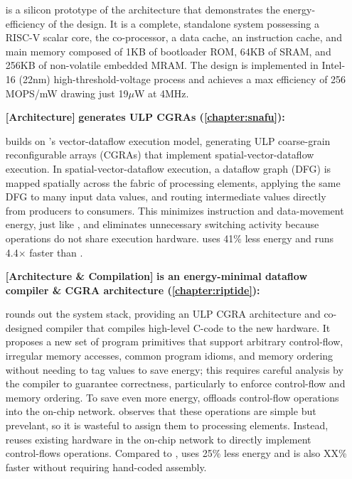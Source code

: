 \begin{itemize}
\manicsilicon is a silicon prototype of the \manic architecture that demonstrates the energy-efficiency of the design.
% 
It is a complete, standalone system possessing a RISC-V scalar core, the \manic co-processor, a data cache, an instruction cache, and main memory composed of 1KB of bootloader ROM, 64KB of SRAM, and 256KB of non-volatile embedded MRAM.
% 
The design is implemented in Intel-16 (22nm) high-threshold-voltage process and achieves a max efficiency of 256 MOPS/mW drawing just 19$\mu$W at 4MHz.
% 

\item[\textbf{[Architecture]}]
\textbf{\snafu generates ULP CGRAs (\autoref{chapter:snafu}): }

\snafu builds on \manic's vector-dataflow execution model, generating ULP coarse-grain reconfigurable arrays (CGRAs) that implement spatial-vector-dataflow execution.
% 
In spatial-vector-dataflow execution, a dataflow graph (DFG) is mapped spatially across the fabric of processing elements, applying the same DFG to many input data values, and routing intermediate values directly from producers to consumers.
% 
This minimizes instruction and data-movement energy, just like \manic, and eliminates unnecessary switching activity because operations do not share execution hardware.
% 
\snafu uses 41$\%$ less energy and runs 4.4$\times$ faster than \manic.
% 

\item[\textbf{[Architecture \& Compilation]}]
\textbf{\riptide is an energy-minimal dataflow compiler \& CGRA architecture (\autoref{chapter:riptide}): }

\riptide rounds out the system stack, providing an ULP CGRA architecture and co-designed compiler that compiles high-level C-code to the new hardware.
% 
It proposes a new set of program primitives that support arbitrary control-flow, irregular memory accesses, common program idioms, and memory ordering without needing to tag values to save energy; this requires careful analysis by the compiler to guarantee correctness, particularly to enforce control-flow and memory ordering.
% 
To save even more energy, \riptide offloads control-flow operations into the on-chip network.
% 
\riptide observes that these operations are simple but prevelant, so it is wasteful to assign them to processing elements.
% 
Instead, \riptide reuses existing hardware in the on-chip network to directly implement control-flows operations.
% 
Compared to \snafu, \riptide uses 25\% less energy and is also XX\% faster without requiring hand-coded assembly.
% 

\end{itemize}

